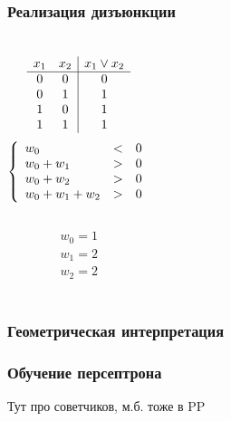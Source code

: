 \documentclass[24pt,pdf,hyperref={unicode}]{beamer}
\begin{document}
\begin{frame}\frametitle{Реализация дизъюнкции}
\begin{columns}
$$
\begin{array}{c c | c}
x_1 & x_2 & x_1\vee x_2 \\
\hline
0 & 0 & 0 \\
0 & 1 & 1 \\
1 & 0 & 1 \\
1 & 1 & 1 \\
\end{array}
$$
$$
\left\{
\begin{array}{l l l l l l}
 w_0       & < & 0 \\
 w_0 + w_1 & > & 0 \\
 w_0 + w_2 & > & 0 \\
 w_0 + w_1 + w_2 & > & 0 \\
\end{array}
\right.
$$\\[1cm]
$$
\begin{array}{l}
 w_0 = 1 \\
 w_1 = 2 \\
 w_2 = 2 \\
\end{array}
$$
\end{columns}
\end{frame}

\begin{frame}\frametitle{Геометрическая интерпретация}
\uncover<+->{}
\end{frame}

\begin{frame}\frametitle{Обучение персептрона}
Тут про советчиков, м.б. тоже в PP
\end{frame}
\end{document}
